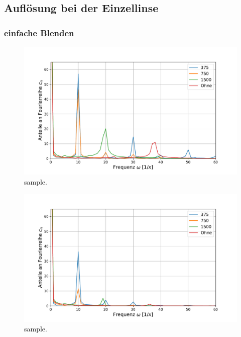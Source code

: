 	\subsection{Auflösung bei der Einzellinse}

		\subsubsection{einfache Blenden}
						
			\begin{figure}[ht]
				\centering
				\includegraphics[width=1\textwidth]{data/FFTLinie1.pdf}
				\caption{sample.}
				\label{fig:FFT1}	
			\end{figure}
			
			\begin{figure}[ht]
				\centering
				\includegraphics[width=1\textwidth]{data/FFTLinie4.pdf}
				\caption{sample.}
				\label{fig:FFT2}	
			\end{figure}
			
